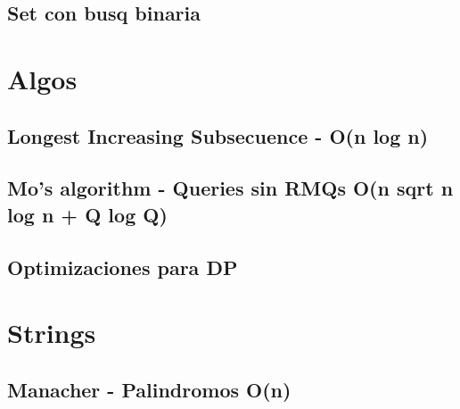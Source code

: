 \subsection{Set con busq binaria}

\section{Algos}%
\subsection{Longest Increasing Subsecuence - O(n log n)}
\subsection{Mo's algorithm - Queries sin RMQs O(n sqrt n log n + Q log Q)}
\subsection{Optimizaciones para DP} %

\section{Strings}%
\subsection{Manacher - Palindromos O(n)}
